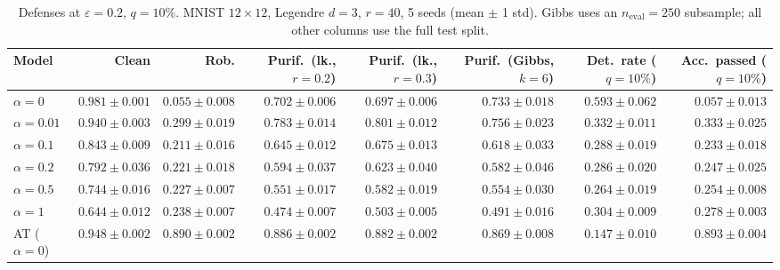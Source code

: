\begin{table}[htbp]
  \centering
  \small
  \begin{tabular}{@{}lrrrrrrr@{}}
    \toprule
    Model & Clean & Rob. & Purif.\ (lk., $r{=}0.2$) & Purif.\ (lk., $r{=}0.3$) & Purif.\ (Gibbs, $k{=}6$) & Det.\ rate ($q{=}10\%$) & Acc.\ passed ($q{=}10\%$) \\
    \midrule
    $\alpha{=}0$ & $\mathbf{0.981 \pm 0.001}$ & $0.055 \pm 0.008$ & $0.702 \pm 0.006$ & $0.697 \pm 0.006$ & $0.733 \pm 0.018$ & $\mathbf{0.593 \pm 0.062}$ & $0.057 \pm 0.013$ \\
    $\alpha{=}0.01$ & $0.940 \pm 0.003$ & $0.299 \pm 0.019$ & $0.783 \pm 0.014$ & $0.801 \pm 0.012$ & $0.756 \pm 0.023$ & $0.332 \pm 0.011$ & $0.333 \pm 0.025$ \\
    $\alpha{=}0.1$ & $0.843 \pm 0.009$ & $0.211 \pm 0.016$ & $0.645 \pm 0.012$ & $0.675 \pm 0.013$ & $0.618 \pm 0.033$ & $0.288 \pm 0.019$ & $0.233 \pm 0.018$ \\
    $\alpha{=}0.2$ & $0.792 \pm 0.036$ & $0.221 \pm 0.018$ & $0.594 \pm 0.037$ & $0.623 \pm 0.040$ & $0.582 \pm 0.046$ & $0.286 \pm 0.020$ & $0.247 \pm 0.025$ \\
    $\alpha{=}0.5$ & $0.744 \pm 0.016$ & $0.227 \pm 0.007$ & $0.551 \pm 0.017$ & $0.582 \pm 0.019$ & $0.554 \pm 0.030$ & $0.264 \pm 0.019$ & $0.254 \pm 0.008$ \\
    $\alpha{=}1$ & $0.644 \pm 0.012$ & $0.238 \pm 0.007$ & $0.474 \pm 0.007$ & $0.503 \pm 0.005$ & $0.491 \pm 0.016$ & $0.304 \pm 0.009$ & $0.278 \pm 0.003$ \\
    AT ($\alpha{=}0$) & $0.948 \pm 0.002$ & $\mathbf{0.890 \pm 0.002}$ & $\mathbf{0.886 \pm 0.002}$ & $\mathbf{0.882 \pm 0.002}$ & $\mathbf{0.869 \pm 0.008}$ & $0.147 \pm 0.010$ & $\mathbf{0.893 \pm 0.004}$ \\
    \bottomrule
  \end{tabular}
  \caption{Defenses at $\varepsilon=0.2$, $q{=}10\%$. MNIST $12\times12$, Legendre $d{=}3$, $r{=}40$, 5 seeds (mean $\pm$ 1 std). Gibbs uses an $n_{\mathrm{eval}}=250$ subsample; all other columns use the full test split.}
  \label{tab:mnist_r12_models_r40_eps0.2}
\end{table}

